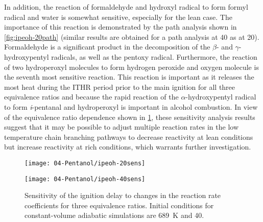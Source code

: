 \documentclass[../main.tex]{subfiles}
\begin{document}
In addition, the reaction of formaldehyde and hydroxyl radical to form
formyl radical and water is somewhat sensitive, especially for
the lean case. The importance of this reaction is demonstrated by the
path analysis shown in \cref{fig:ipeoh-20path} (similar results are
obtained for a path analysis at \SI{40}{\atmosphere} as at
\SI{20}{\atmosphere}). Formaldehyde is a significant product in
the decomposition of the $\beta$- and $\gamma$-hydroxypentyl radicals,
as well as the pentoxy radical. Furthermore, the reaction of two
hydroperoxyl molecules to form hydrogen peroxide and oxygen molecule is the
seventh most sensitive reaction. This reaction is important as it releases
the most heat during the ITHR period prior to the main ignition for all
three equivalence ratios and because the rapid reaction of the
$\alpha$-hydroxypentyl radical to form \textit{i}-pentanal and hydroperoxyl
is important in alcohol combustion. In view of the equivalence ratio
dependence shown in \cref{fig:ipeoh-40sens}, these sensitivity analysis
results suggest that it may be possible to adjust multiple reaction
rates in the low temperature chain branching pathways to decrease
reactivity at lean conditions but increase reactivity at rich
conditions, which warrants further investigation.

\begin{figure}
    \ffigbox
        {\texttt{[image: 04-Pentanol/ipeoh-20sens]}}
        {\caption{Sensitivity of the ignition delay to changes in
        the reaction rate coefficients for three equivalence ratios.
        Initial conditions for constant-volume adiabatic simulations are
        \SI{800}{\kelvin} and \SI{20}{\atmosphere}.}
        \label{fig:ipeoh-20sens}}
    \par
    \vspace{10pt}
    \ffigbox
        {\texttt{[image: 04-Pentanol/ipeoh-40sens]}}
        {\caption{Sensitivity of the ignition delay to changes in
        the reaction rate coefficients for three equivalence ratios.
        Initial conditions for constant-volume adiabatic simulations are
        \SI{689}{\kelvin} and \SI{40}{\atmosphere}.}
        \label{fig:ipeoh-40sens}}
\end{figure}
\end{document}

